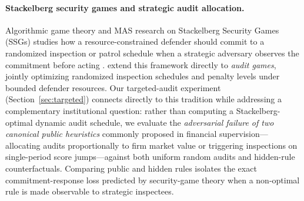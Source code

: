 \documentclass[11pt]{article}
\begin{document}
\paragraph{Stackelberg security games and strategic audit allocation.}
Algorithmic game theory and MAS research on Stackelberg Security Games (SSGs) studies how a resource-constrained defender should commit to a randomized inspection or patrol schedule when a strategic adversary observes the commitment before acting \citep{conitzer2006computing,kiekintveld2009computing,tambe2011security,sinha2018stackelberg}. \citet{blocki2015audit} extend this framework directly to \emph{audit games}, jointly optimizing randomized inspection schedules and penalty levels under bounded defender resources. Our targeted-audit experiment (Section~\ref{sec:targeted}) connects directly to this tradition while addressing a complementary institutional question: rather than computing a Stackelberg-optimal dynamic audit schedule, we evaluate the \emph{adversarial failure of two canonical public heuristics} commonly proposed in financial supervision---allocating audits proportionally to firm market value or triggering inspections on single-period score jumps---against both uniform random audits and hidden-rule counterfactuals. Comparing public and hidden rules isolates the exact commitment-response loss predicted by security-game theory when a non-optimal rule is made observable to strategic inspectees.
\end{document}
